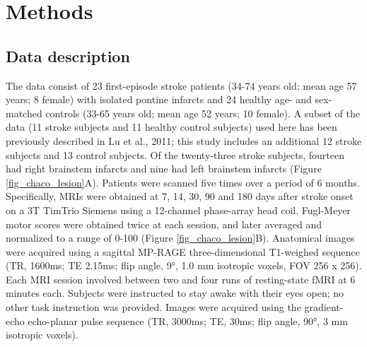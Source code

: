 \documentclass[phd,tocprelim]{cornell}
\begin{document}
\section{Methods}

	\subsection{Data description}
	 The data consist of 23 first-episode stroke patients (34-74 years old; mean age 57 years; 8 female) with isolated pontine infarcts and 24 healthy age- and sex-matched controls (33-65 years old; mean age 52 years; 10 female). A subset of the data (11 stroke subjects and 11 healthy control subjects) used here has been previously described in Lu et al., 2011; this study includes an additional 12 stroke subjects and 13 control subjects. Of the twenty-three stroke subjects, fourteen  had right brainstem infarcts and nine had left brainstem infarcts (Figure \ref{fig_chaco_lesion}A). Patients were scanned five times over a period of 6 months. Specifically, MRIs were obtained at 7, 14, 30, 90 and 180 days after stroke onset on a 3T TimTrio Siemens using a 12-channel phase-array head coil. Fugl-Meyer motor scores were obtained twice at each session, and later averaged and normalized to a range of 0-100 (Figure \ref{fig_chaco_lesion}B). Anatomical images were acquired using a sagittal MP-RAGE three-dimensional T1-weighed sequence (TR, 1600ms; TE 2.15ms; flip angle, 9°, 1.0 mm isotropic voxels, FOV 256 x 256). Each MRI session involved between two and four runs of resting-state fMRI at 6 minutes each. Subjects were instructed to stay awake with their eyes open; no other task instruction was provided. Images were acquired using the gradient-echo echo-planar pulse sequence (TR, 3000ms; TE, 30ms; flip angle, 90°, 3 mm isotropic voxels).
\end{document}
